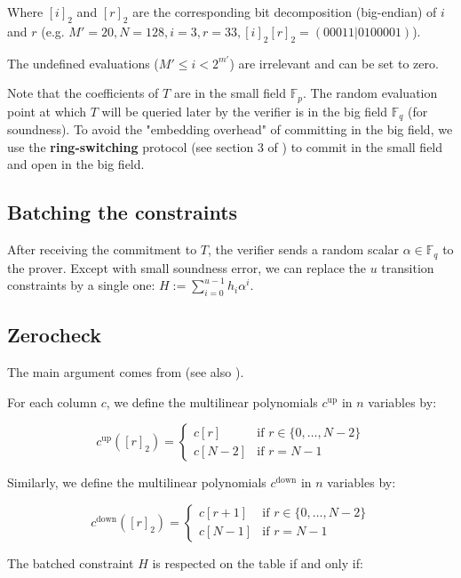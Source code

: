 \documentclass{article}
\newcommand{\Fp}{\mathbb F_p}
\newcommand{\Fq}{\mathbb F_q}
\newcommand{\Pol}{T}
\begin{document}
Where $[i]_2$ and $[r]_2$ are the corresponding bit decomposition (big-endian) of $i$ and $r$ (e.g. $M' = 20, N = 128, i = 3, r = 33, [i]_2[r]_2 = (00011 | 0100001)$).

The undefined evaluations ($M' \leq i < 2^{m'}$) are irrelevant and can be set to zero.

Note that the coefficients of $\Pol$ are in the small field $\Fp$. The random evaluation point at which $\Pol$ will be queried later by the verifier is in the big field $\Fq$ (for soundness). To avoid the "embedding overhead" of committing in the big field, we use the \textbf{ring-switching} protocol (see section 3 of \cite{fri_binius}) to commit in the small field and open in the big field.

\subsection{Batching the constraints}

After receiving the commitment to $\Pol$, the verifier sends a random scalar $\alpha \in \Fq$ to the prover. Except with small soundness error, we can replace the $u$ transition constraints by a single one: $H := \sum_{i=0}^{u-1} h_i \alpha^i $.

\subsection{Zerocheck} \label{zerocheck}

The main argument comes from \cite{ccs} (see also \cite{simple_multivariate_AIR}).

For each column $c$, we define the multilinear polynomials $c^{\text{up}}$ in $n$ variables by:

$$c^{\text{up}}([r]_2)  = \begin{cases}
			c[r] & \text{if } r \in \{0, \dots, N-2\}\\
            c[N-2] & \text{if } r = N-1
		 \end{cases}$$

Similarly, we define the multilinear polynomials $c^{\text{down}}$ in $n$ variables by:

$$c^{\text{down}}([r]_2)  = \begin{cases}
			c[r+1] & \text{if } r \in \{0, \dots, N-2\}\\
            c[N-1] & \text{if } r = N-1
		 \end{cases}$$

The batched constraint $H$ is respected on the table if and only if:
\end{document}
